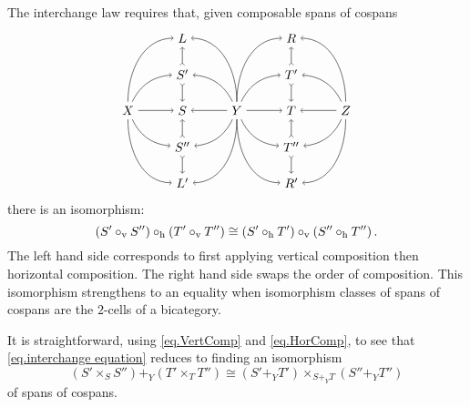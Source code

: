 \documentclass{tac}
\renewcommand{\t}[1]{\textup{#1}}
\begin{document}
The interchange law requires that, given composable spans of cospans
	\begin{equation} \label{diag.2cells interchanged}
		\begin{tikzpicture}
		\node (X) at (-4,0) {$X$};
		\node (Y) at (-1,0) {$Y$};
		\node (Z) at (2,0) {$Z$};
		\node (L) at (-2.5,2) {$L$};
		\node (S') at (-2.5,1) {$S'$};
		\node (S) at (-2.5,0) {$S$};
		\node (S'') at (-2.5,-1) {$S''$};
		\node (L') at (-2.5,-2) {$L'$};
		\node (R) at (0.5,2) {$R$};
		\node (T') at (0.5,1) {$T'$};
		\node (T) at (0.5,0) {$T$};
		\node (T'') at (0.5,-1) {$T''$};
		\node (R') at (0.5,-2) {$R'$};
		\draw [->] (X) edge[out=90,in=180] (L);
		\draw [->] (X) edge[bend left=30] (S');
		\draw [->] (X) edge (S);
		\draw [->] (X) edge[bend right=30] (S'');
		\draw [->] (X) edge[out=-90,in=180] (L');
		\draw [->] (Y) edge[out=90,in=0] (L);
		\draw [->] (Y) edge[bend right=30] (S');
		\draw [->] (Y) edge (S);
		\draw [->] (Y) edge[bend left=30] (S'');
		\draw [->] (Y) edge[out=-90,in=0] (L');
		\draw [->] (Y) edge[out=90,in=180] (R);
		\draw [->] (Y) edge[bend left=30] (T');
		\draw [->] (Y) edge (T);
		\draw [->] (Y) edge[bend right=30] (T'');
		\draw [->] (Y) edge[out=-90,in=180] (R');
		\draw [->] (Z) edge[out=90,in=0] (R);
		\draw [->] (Z) edge[bend right=30] (T');
		\draw [->] (Z) edge (T);
		\draw [->] (Z) edge[bend left=30] (T'');
		\draw [->] (Z) edge[out=-90,in=0] (R');
		\draw [>->] (S') edge (L);
		\draw [>->] (S') edge (S);
		\draw [>->] (S'') edge (S);
		\draw [>->] (S'') edge (L');
		\draw [>->] (T') edge (R);
		\draw [>->] (T') edge (T);
		\draw [>->] (T'') edge (T);
		\draw [>->] (T'') edge (R');
		\end{tikzpicture}
	\end{equation}
there is an isomorphism:
	\begin{equation} \label{eq.interchange equation}
		\left( S' \circ_\t{v} S'' \right) \circ_\t{h} 
		\left( T' \circ_\t{v} T'' \right) \cong
		\left( S' \circ_\t{h} T' \right) \circ_\t{v} 
		\left( S'' \circ_\t{h} T'' \right).
	\end{equation}
The left hand side corresponds to first applying 
vertical composition then horizontal composition. 
The right hand side swaps the order of composition. 
This isomorphism strengthens to an equality 
when isomorphism classes of spans of cospans are 
the $2$-cells of a bicategory.

It is straightforward, using 
	\eqref{eq.VertComp} 
and 
	\eqref{eq.HorComp}, 
to see that 
	\eqref{eq.interchange equation} 
reduces to finding an isomorphism
	\begin{equation} \label{eq.interchange simplified}
		( S' \times_S S'' ) +_Y ( T' \times_T T'' )
		\cong
		( S' +_Y T' ) \times_{ S +_Y T } ( S'' +_Y T'' )
	\end{equation}
of spans of cospans.
\end{document}

